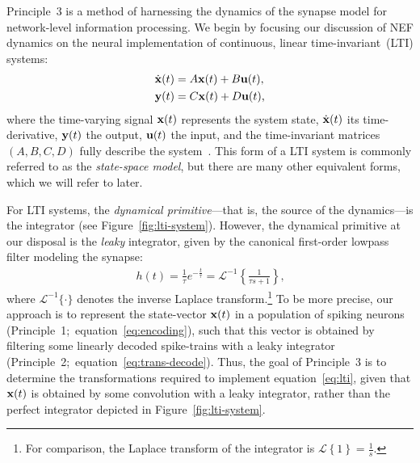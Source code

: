Principle~3 is a method of harnessing the dynamics of the synapse model for network-level information processing.
We begin by focusing our discussion of NEF dynamics on the neural implementation of continuous, linear time-invariant~(LTI) systems:
\begin{equation} \label{eq:lti}
\begin{split}
\dot{\mathbf{x}}(t) &= A\mathbf{x}(t) + B\mathbf{u}(t) \text{,} \\
\mathbf{y}(t) &= C\mathbf{x}(t) + D\mathbf{u}(t) \text{,}
\end{split}
\end{equation}
where the time-varying signal $\mathbf{x}(t)$ represents the system state, $\dot{\mathbf{x}}(t)$ its time-derivative, $\mathbf{y}(t)$ the output, $\mathbf{u}(t)$ the input, and the time-invariant matrices $(A\text{,}\, B\text{,}\, C\text{,}\, D)$ fully describe the system~\citep{brogan1982modern}.
This form of a LTI system is commonly referred to as the \emph{state-space model}, but there are many other equivalent forms, which we will refer to later.

For LTI systems, the \emph{dynamical primitive}---that is, the source of the dynamics---is the integrator (see Figure~\ref{fig:lti-system}).
However, the dynamical primitive at our disposal is the \emph{leaky} integrator, given by the canonical first-order lowpass filter modeling the synapse:
\begin{align} \label{eq:lowpass}
h(t) = \frac{1}{\tau} e^{-\frac{t}{\tau}} = \mathcal{L}^{-1}\left\{ \frac{1}{\tau s + 1} \right\} \text{,}
\end{align}
where $\mathcal{L}^{-1}\{ \cdot \}$ denotes the inverse Laplace transform.\footnote{
For comparison, the Laplace transform of the integrator is $\mathcal{L}\left\{ 1 \right\} = \frac{1}{s}$.}
To be more precise, our approach is to represent the state-vector $\mathbf{x}(t)$ in a population of spiking neurons (Principle~1;~equation~\ref{eq:encoding}), such that this vector is obtained by filtering some linearly decoded spike-trains with a leaky integrator (Principle~2;~equation~\ref{eq:trans-decode}).
Thus, the goal of Principle~3 is to determine the transformations required to implement equation~\ref{eq:lti}, given that $\mathbf{x}(t)$ is obtained by some convolution with a leaky integrator, rather than the perfect integrator depicted in Figure~\ref{fig:lti-system}.

